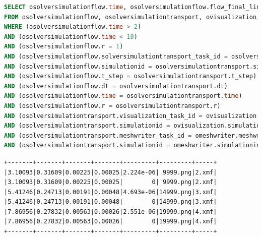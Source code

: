 \begin{lstlisting}[language=sql,deletendkeywords={TIME},label={lst:experiments-3c-sql},caption={[Código em SQL gerado na consulta~\#3C]Código em SQL gerado na consulta~\#3C (tempo médio: 43,20~ms).}]
SELECT osolversimulationflow.time, osolversimulationflow.flow_final_linear_residual, osolversimulationflow.flow_norm_delta_u, osolversimulationtransport.transport_final_linear_residual, osolversimulationtransport.transport_norm_delta_u, ovisualization.png, omeshwriter.xdmf
FROM osolversimulationflow, osolversimulationtransport, ovisualization, omeshwriter
WHERE (osolversimulationflow.time > 2) 
AND (osolversimulationflow.time < 10) 
AND (osolversimulationflow.r = 1) 
AND (osolversimulationflow.solversimulationtransport_task_id = osolversimulationtransport.solversimulationtransport_task_id) 
AND (osolversimulationflow.simulationid = osolversimulationtransport.simulationid) 
AND (osolversimulationflow.t_step = osolversimulationtransport.t_step) 
AND (osolversimulationflow.dt = osolversimulationtransport.dt) 
AND (osolversimulationflow.time = osolversimulationtransport.time) 
AND (osolversimulationflow.r = osolversimulationtransport.r) 
AND (osolversimulationtransport.visualization_task_id = ovisualization.visualization_task_id) 
AND (osolversimulationtransport.simulationid = ovisualization.simulationid) 
AND (osolversimulationtransport.meshwriter_task_id = omeshwriter.meshwriter_task_id) 
AND (osolversimulationtransport.simulationid = omeshwriter.simulationid);
\end{lstlisting}

\begin{lstlisting}[language=sqlresults,label={lst:experiments-3c-sqlresults},caption={[Versão simplificada dos resultados da consulta \#3C.]Resultados da consulta \#3C (6 tuplas, tempo médio: 11,88~ms).}]
+-------+-------+-------+-------+---------+---------+-----+
|3.10093|0.31609|0.00225|0.00025|2.224e-06| 9999.png|2.xmf|
|3.10093|0.31609|0.00225|0.00025|        0| 9999.png|2.xmf|
|5.41246|0.24713|0.00191|0.00048|4.693e-06|14999.png|3.xmf|
|5.41246|0.24713|0.00191|0.00048|        0|14999.png|3.xmf|
|7.86956|0.27832|0.00563|0.00026|2.551e-06|19999.png|4.xmf|
|7.86956|0.27832|0.00563|0.00026|        0|19999.png|4.xmf|
+-------+-------+-------+-------+---------+---------+-----+
\end{lstlisting}

